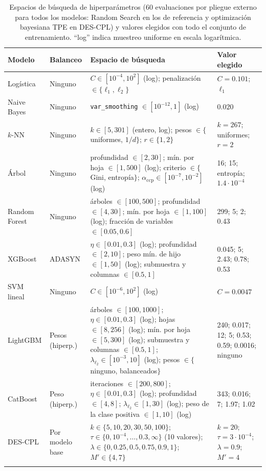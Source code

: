 \documentclass[pdflatex,sn-mathphys-num]{sn-jnl}
\theoremstyle{plain}
\begin{document}
\begin{table}[!htbp]
\caption{Espacios de búsqueda de hiperparámetros (60 evaluaciones por pliegue externo para todos los modelos: Random Search en los de referencia y optimización bayesiana TPE en DES-CPL) y valores elegidos con todo el conjunto de entrenamiento. ``log'' indica muestreo uniforme en escala logarítmica.}\label{tab:hiper}
\footnotesize
\begin{tabular}{@{}p{1.75cm}p{1.35cm}p{5.6cm}p{2.9cm}@{}}
\toprule
Modelo & Balanceo & Espacio de búsqueda & Valor elegido \\
\midrule
Logística & Ninguno & $C\in[10^{-4},10^{2}]$ (log); penalización $\in\{\ell_1,\ell_2\}$ & $C=0.101$; $\ell_1$ \\
Naive Bayes & Ninguno & \texttt{var\_smoothing} $\in[10^{-12},1]$ (log) & $0.020$ \\
$k$-NN & Ninguno & $k\in[5,301]$ (entero, log); pesos $\in\{$uniformes, $1/d\}$; $r\in\{1,2\}$ & $k=267$; uniformes; $r=2$ \\
Árbol & Ninguno & profundidad $\in[2,30]$; mín. por hoja $\in[1,500]$ (log); criterio $\in\{$Gini, entropía$\}$; $\alpha_{\text{ccp}}\in[10^{-7},10^{-2}]$ (log) & 16; 15; entropía; $1.4\cdot10^{-4}$ \\
Random Forest & Ninguno & árboles $\in[100,500]$; profundidad $\in[4,30]$; mín. por hoja $\in[1,100]$ (log); fracción de variables $\in[0.05,0.6]$ & 299; 5; 2; 0.43 \\
XGBoost & ADASYN & $\eta\in[0.01,0.3]$ (log); profundidad $\in[2,10]$; peso mín. de hijo $\in[1,50]$ (log); submuestra y columnas $\in[0.5,1]$ & 0.045; 5; 2.43; 0.78; 0.53 \\
SVM lineal & Ninguno & $C\in[10^{-6},10^{2}]$ (log) & $C=0.0047$ \\
LightGBM & Pesos (hiperp.) & árboles $\in[100,1000]$; $\eta\in[0.01,0.3]$ (log); hojas $\in[8,256]$ (log); mín. por hoja $\in[5,300]$ (log); submuestra y columnas $\in[0.5,1]$; $\lambda_{\ell_2}\in[10^{-3},10]$ (log); pesos $\in\{$ninguno, balanceados$\}$ & 240; 0.017; 12; 5; 0.53; 0.59; 0.0016; ninguno \\
CatBoost & Peso (hiperp.) & iteraciones $\in[200,800]$; $\eta\in[0.01,0.3]$ (log); profundidad $\in[4,8]$; $\lambda_{\ell_2}\in[1,30]$ (log); peso de la clase positiva $\in[1,10]$ (log) & 343; 0.016; 7; 1.97; 1.02 \\
DES-CPL & Por modelo base & $k\in\{5,10,20,30,50,100\}$; $\tau\in\{0,10^{-4},\dots,0.3,\infty\}$ (10 valores); $\lambda\in\{0,0.25,0.5,0.75,0.9,1\}$; $M'\in\{4,7\}$ & $k=20$; $\tau=3\cdot10^{-4}$; $\lambda=0.9$; $M'=4$ \\
\botrule
\end{tabular}
\end{table}
\end{document}

